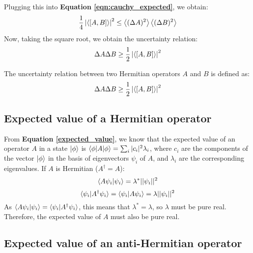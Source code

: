 Plugging this into \textbf{Equation \ref{eqn:cauchy_expected}}, we obtain:
\begin{equation}
    \frac14 \left|\left\langle[A, B]\right\rangle\right|^2 \leq \left\langle(\Delta A)^2\right\rangle\left\langle(\Delta B)^2\right\rangle
\end{equation}
Now, taking the square root, we obtain the uncertainty relation:
\begin{equation}
    \Delta A\Delta B \geq \frac12 \left|\left\langle[A, B]\right\rangle\right|^2
\end{equation}

\begin{definition}
    The uncertainty relation between two Hermitian operators $A$ and $B$ is defined as:
    \begin{equation}
        \Delta A\Delta B \geq \frac12 \left|\left\langle[A, B]\right\rangle\right|^2
    \end{equation}
\end{definition}

\subsection{Expected value of a Hermitian operator} \label{expected_value_hermitian}

From \textbf{Equation \ref{expected_value}}, we know that the expected value of an operator $A$ in a state $\ket{\phi}$ is $\braket{\phi|A|\phi} = \sum_i|c_i|^2\lambda_i$, where $c_i$ are the components of the vector $\ket{\phi}$ in the basis of eigenvectors $\psi_i$ of $A$, and $\lambda_i$ are the corresponding eigenvalues. If $A$ is Hermitian ($A^\dagger = A$):
\begin{equation}
    \braket{A\psi_i|\psi_i} = \lambda^*||\psi_i||^2
\end{equation}
\begin{equation}
    \braket{\psi_i|A^\dagger\psi_i} = \braket{\psi_i|A\psi_i} = \lambda||\psi_i||^2
\end{equation} 
As $\braket{A\psi_i|\psi_i} = \braket{\psi_i|A^\dagger \psi_i}$, this means that $\lambda^* = \lambda$, so $\lambda$ must be pure real. Therefore, the expected value of $A$ must also be pure real.

\subsection{Expected value of an anti-Hermitian operator} \label{expected_value_anti_hermitian}

